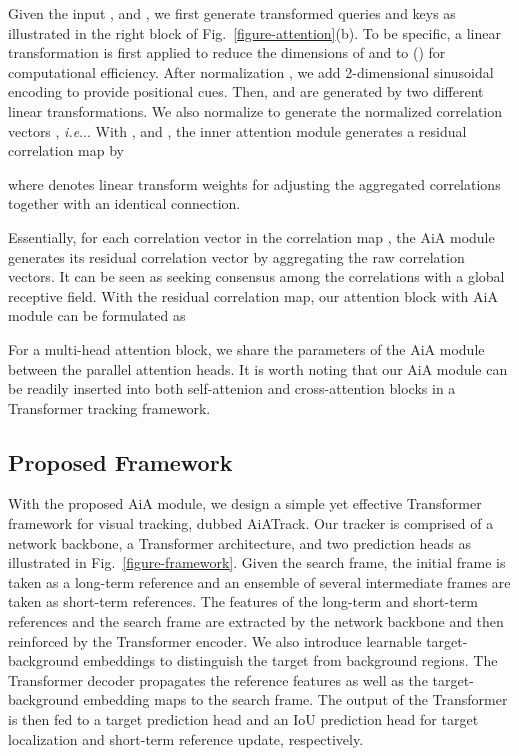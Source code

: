 \documentclass[runningheads]{llncs}
\makeatletter
\DeclareRobustCommand\onedot{\futurelet\@let@token\@onedot}
\def\@onedot{\ifx\@let@token.\else.\null\fi\xspace}
\def\ie{\emph{i.e}\onedot} \def\Ie{\emph{I.e}\onedot}
\makeatother
\begin{document}
Given the input ,  and , we first generate transformed queries  and keys  as illustrated in the right block of Fig.~\ref{figure-attention}(b). To be specific, a linear transformation is first applied to reduce the dimensions of  and  to  () for computational efficiency. After normalization \cite{ba2016layer}, we add 2-dimensional sinusoidal encoding \cite{dosovitskiy2020image,carion2020end} to provide positional cues. Then,  and  are generated by two different linear transformations. We also normalize  to generate the normalized correlation vectors , \ie . With ,  and , the inner attention module generates a residual correlation map by

where  denotes linear transform weights for adjusting the aggregated correlations together with an identical connection.

Essentially, for each correlation vector in the correlation map , the AiA module generates its residual correlation vector by aggregating the raw correlation vectors. It can be seen as seeking consensus among the correlations with a global receptive field. With the residual correlation map, our attention block with AiA module can be formulated as


For a multi-head attention block, we share the parameters of the AiA module between the parallel attention heads. It is worth noting that our AiA module can be readily inserted into both self-attenion and cross-attention blocks in a Transformer tracking framework.

\subsection{Proposed Framework}\label{section-network}
With the proposed AiA module, we design a simple yet effective Transformer framework for visual tracking, dubbed AiATrack. Our tracker is comprised of a network backbone, a Transformer architecture, and two prediction heads as illustrated in Fig.~\ref{figure-framework}. Given the search frame, the initial frame is taken as a long-term reference and an ensemble of several intermediate frames are taken as short-term references. The features of the long-term and short-term references and the search frame are extracted by the network backbone and then reinforced by the Transformer encoder. We also introduce learnable target-background embeddings to distinguish the target from background regions. The Transformer decoder propagates the reference features as well as the target-background embedding maps to the search frame. The output of the Transformer is then fed to a target prediction head and an IoU prediction head for target localization and short-term reference update, respectively.
\end{document}
